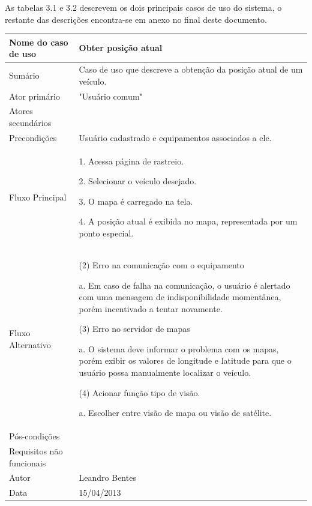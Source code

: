 As tabelas 3.1 e 3.2 descrevem os dois principais casos de uso do sistema, o restante das descrições encontra-se  em anexo no final deste documento.
\newpage
\begin{flushleft}
\tablefirsthead{}
\tablehead{}
\tabletail{}
\tablelasttail{}
\begin{supertabular}{|m{5.5680003cm}|m{9.325cm}|}
\hline
Nome do caso de uso &
Obter posição atual\\\hline
Sumário &
Caso de uso que descreve a obtenção da posição atual de um veículo. \\\hline
Ator primário &
"Usuário comum"\\\hline
Atores secundários &
~
\\\hline
Precondições &
Usuário cadastrado e equipamentos associados a ele. \\\hline
Fluxo Principal &
1. Acessa página de rastreio.

2. Selecionar o veículo desejado.

3. O mapa é carregado na tela.

4. A posição atual é exibida no mapa, representada por um ponto especial.\\\hline
Fluxo Alternativo &
(2) Erro na comunicação com o equipamento

a. Em caso de falha na comunicação, o usuário é alertado com uma mensagem de indisponibilidade momentânea, porém incentivado a tentar novamente.

(3) Erro no servidor de mapas

a. O sistema deve informar o problema com os mapas, porém exibir os valores de longitude e latitude para que o usuário possa manualmente localizar o veículo.

(4) Acionar função tipo de visão.

a. Escolher entre visão de mapa ou visão de satélite.\\\hline
Pós-condições &
~
\\\hline
Requisitos não funcionais &
~\\\hline
Autor &
Leandro Bentes\\\hline
Data &
15/04/2013\\\hline
\end{supertabular}
\end{flushleft}

